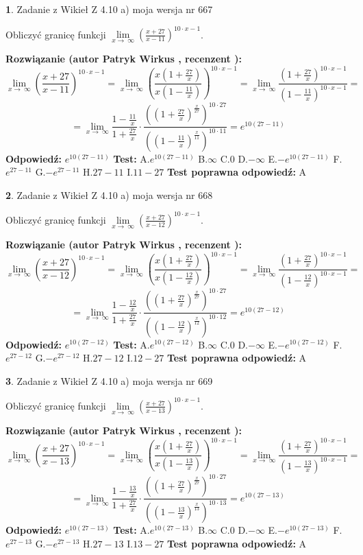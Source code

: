 \documentclass[12pt, a4paper]{article}
\theoremstyle{definition} %
\newtheorem{zad}{}
\newcommand{\zadStart}[1]{\begin{zad}#1\newline}
\newcommand{\zadStop}{\end{zad}}
\newcommand{\rozwStart}[2]{\noindent \textbf{Rozwiązanie (autor #1 , recenzent #2): }\newline}
\newcommand{\rozwStop}{\newline}
\newcommand{\odpStart}{\noindent \textbf{Odpowiedź:}\newline}
\newcommand{\odpStop}{\newline}
\newcommand{\testStart}{\noindent \textbf{Test:}\newline}
\newcommand{\testStop}{\newline}
\newcommand{\kluczStart}{\noindent \textbf{Test poprawna odpowiedź:}\newline}
\newcommand{\kluczStop}{\newline}
\begin{document}
\zadStart{Zadanie z Wikieł Z 4.10 a) moja wersja nr 667}


Obliczyć granicę funkcji  $\lim\limits_{x\to\ \infty}(\frac{x+27}{x-11})^{10\cdot x-1}$.
\zadStop
\rozwStart{Patryk Wirkus}{}
$$\lim\limits_{x\to\ \infty}(\frac{x+27}{x-11})^{10\cdot x-1} = \lim\limits_{x\to\ \infty}(\frac{x(1+\frac{27}{x})}{x(1-\frac{11}{x})})^{10\cdot x-1}=\lim\limits_{x\to\ \infty}\frac{(1+\frac{27}{x})^{10\cdot x-1}}{(1-\frac{11}{x})^{10\cdot x-1}}=$$
$$=\lim\limits_{x\to\ \infty}\frac{1-\frac{11}{x}}{1+\frac{27}{x}}\cdot\frac{((1+\frac{27}{x})^{\frac{x}{27}})^{10\cdot27}}{((1-\frac{11}{x})^{\frac{x}{11}})^{10\cdot11}}=e^{10(27-11)}$$
\rozwStop
\odpStart
$e^{10(27-11)}$
\odpStop
\testStart
A.$e^{10(27-11)}$ B.$\infty$ C.$0$ D.$-\infty$ E.$-e^{10(27-11)}$
F.$e^{27-11}$ G.$-e^{27-11}$
H.$27-11$
I.$11-27$
\testStop
\kluczStart
A
\kluczStop



\zadStart{Zadanie z Wikieł Z 4.10 a) moja wersja nr 668}


Obliczyć granicę funkcji  $\lim\limits_{x\to\ \infty}(\frac{x+27}{x-12})^{10\cdot x-1}$.
\zadStop
\rozwStart{Patryk Wirkus}{}
$$\lim\limits_{x\to\ \infty}(\frac{x+27}{x-12})^{10\cdot x-1} = \lim\limits_{x\to\ \infty}(\frac{x(1+\frac{27}{x})}{x(1-\frac{12}{x})})^{10\cdot x-1}=\lim\limits_{x\to\ \infty}\frac{(1+\frac{27}{x})^{10\cdot x-1}}{(1-\frac{12}{x})^{10\cdot x-1}}=$$
$$=\lim\limits_{x\to\ \infty}\frac{1-\frac{12}{x}}{1+\frac{27}{x}}\cdot\frac{((1+\frac{27}{x})^{\frac{x}{27}})^{10\cdot27}}{((1-\frac{12}{x})^{\frac{x}{12}})^{10\cdot12}}=e^{10(27-12)}$$
\rozwStop
\odpStart
$e^{10(27-12)}$
\odpStop
\testStart
A.$e^{10(27-12)}$ B.$\infty$ C.$0$ D.$-\infty$ E.$-e^{10(27-12)}$
F.$e^{27-12}$ G.$-e^{27-12}$
H.$27-12$
I.$12-27$
\testStop
\kluczStart
A
\kluczStop



\zadStart{Zadanie z Wikieł Z 4.10 a) moja wersja nr 669}


Obliczyć granicę funkcji  $\lim\limits_{x\to\ \infty}(\frac{x+27}{x-13})^{10\cdot x-1}$.
\zadStop
\rozwStart{Patryk Wirkus}{}
$$\lim\limits_{x\to\ \infty}(\frac{x+27}{x-13})^{10\cdot x-1} = \lim\limits_{x\to\ \infty}(\frac{x(1+\frac{27}{x})}{x(1-\frac{13}{x})})^{10\cdot x-1}=\lim\limits_{x\to\ \infty}\frac{(1+\frac{27}{x})^{10\cdot x-1}}{(1-\frac{13}{x})^{10\cdot x-1}}=$$
$$=\lim\limits_{x\to\ \infty}\frac{1-\frac{13}{x}}{1+\frac{27}{x}}\cdot\frac{((1+\frac{27}{x})^{\frac{x}{27}})^{10\cdot27}}{((1-\frac{13}{x})^{\frac{x}{13}})^{10\cdot13}}=e^{10(27-13)}$$
\rozwStop
\odpStart
$e^{10(27-13)}$
\odpStop
\testStart
A.$e^{10(27-13)}$ B.$\infty$ C.$0$ D.$-\infty$ E.$-e^{10(27-13)}$
F.$e^{27-13}$ G.$-e^{27-13}$
H.$27-13$
I.$13-27$
\testStop
\kluczStart
A
\kluczStop
\end{document}
